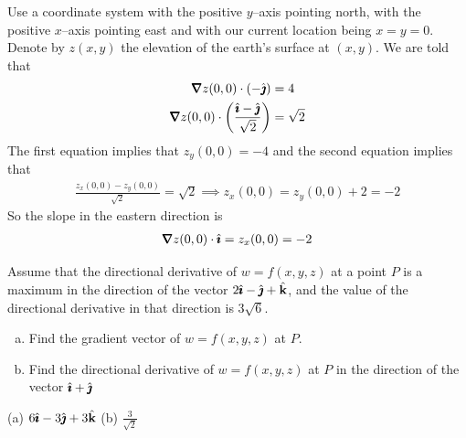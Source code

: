 \begin{solution}
Use a coordinate system with the positive $y$--axis pointing 
north, with the positive $x$--axis pointing east and with our current
location being $x=y=0$. Denote by $z(x,y)$ the elevation of the 
earth's surface at $(x,y)$. We are told that
\begin{align*}
\vnabla z(0,0)\cdot(-\hj) &= 4 \\
\vnabla z(0,0)\cdot\left(\frac{\hi-\hj}{\sqrt{2}}\right) &= \sqrt{2} 
\end{align*}
The first equation implies that $z_y(0,0)=-4$ and the second equation 
implies that
\begin{align*}
\frac{z_x(0,0)-z_y(0,0)}{\sqrt{2}}=\sqrt{2}
\implies
z_x(0,0)=z_y(0,0)+2 = -2
\end{align*}
So the slope in the eastern direction is
\begin{align*}
\vnabla z(0,0)\cdot\hi = z_x(0,0) = -2
\end{align*}

\end{solution}

\begin{question}[M200 2006A] %
Assume that the directional derivative of $w = f(x,y,z)$ at a point $P$ 
is a maximum in the direction of the vector $2\hat{\pmb{\imath}} - \hat{\pmb{\jmath}} + \hat{\mathbf{k}}$, and 
the value of the directional derivative in that direction is $3\sqrt{6}$.
\begin{enumerate}[(a)]
\item
Find the gradient vector of $w = f(x,y,z)$ at $P$. 
\item
Find the directional derivative of $w = f(x,y,z)$ at $P$ in the 
direction of the vector $\hat{\pmb{\imath}} + \hat{\pmb{\jmath}}$
\end{enumerate}
\end{question}

%

\begin{answer}
(a) $6\hat{\pmb{\imath}} - 3\hat{\pmb{\jmath}} + 3\hat{\mathbf{k}}$\qquad
(b) $\frac{3}{\sqrt{2}}$
\end{answer}

